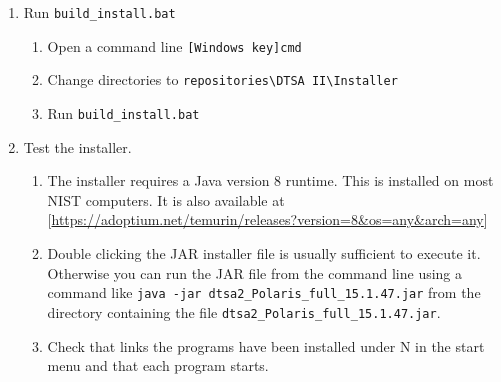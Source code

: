 \documentclass{article}
\begin{document}
\begin{enumerate}
        \begin{verbatim}
REM Version information
SET "D2V=2025-08-25"
SET "NUM_VER=15.1.35"
SET "NAME_VER=Polaris"
        \end{verbatim}
    \begin{enumerate}
        \item At a minimum, increment the final number in \verb|NUM_VER| and set today's date in \verb|D2V|.
    \end{enumerate}
    \item Run \verb|build_install.bat|
    \begin{enumerate}
        \item Open a command line \verb|[Windows key]cmd|
        \item Change directories to \verb|repositories\DTSA II\Installer|
        \item Run \verb|build_install.bat|
    \end{enumerate}
    \item Test the installer.
    \begin{enumerate}
        \item The installer requires a Java version 8 runtime.  This is installed on most NIST computers. It is also available at [\url{https://adoptium.net/temurin/releases?version=8&os=any&arch=any}]
        \item Double clicking the JAR installer file is usually sufficient to execute it. Otherwise you can run the JAR file from the command line using a command like \verb|java -jar dtsa2_Polaris_full_15.1.47.jar| from the directory containing the file \verb|dtsa2_Polaris_full_15.1.47.jar|.
        \item Check that links the programs have been installed under N in the start menu and that each program starts.
    \end{enumerate}
\end{enumerate}
\end{document}
